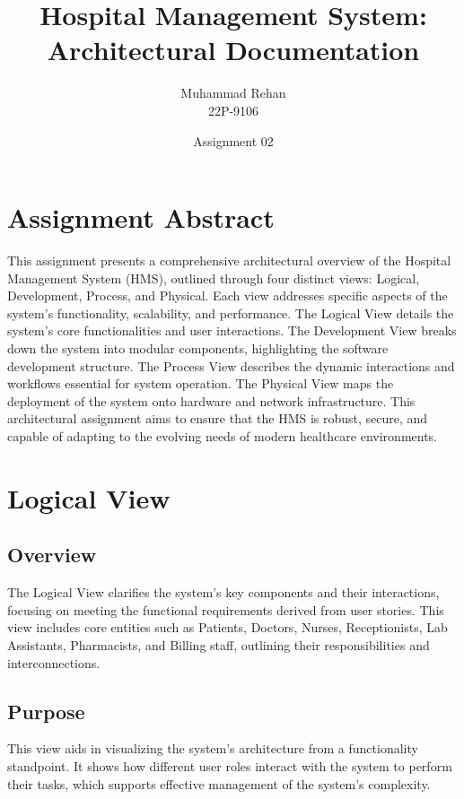 \documentclass[12pt]{article}
\title{Hospital Management System: Architectural Documentation}
\author{Muhammad Rehan \\ 22P-9106}
\date{Assignment 02}
\begin{document}
\maketitle

\section*{Assignment Abstract}
This assignment presents a comprehensive architectural overview of the Hospital Management System (HMS), outlined through four distinct views: Logical, Development, Process, and Physical. Each view addresses specific aspects of the system's functionality, scalability, and performance. The Logical View details the system's core functionalities and user interactions. The Development View breaks down the system into modular components, highlighting the software development structure. The Process View describes the dynamic interactions and workflows essential for system operation. The Physical View maps the deployment of the system onto hardware and network infrastructure. This architectural assignment aims to ensure that the HMS is robust, secure, and capable of adapting to the evolving needs of modern healthcare environments.

\section*{Logical View}
\subsection*{Overview}
The Logical View clarifies the system’s key components and their interactions, focusing on meeting the functional requirements derived from user stories. This view includes core entities such as Patients, Doctors, Nurses, Receptionists, Lab Assistants, Pharmacists, and Billing staff, outlining their responsibilities and interconnections.

\subsection*{Purpose}
This view aids in visualizing the system’s architecture from a functionality standpoint. It shows how different user roles interact with the system to perform their tasks, which supports effective management of the system’s complexity.
\end{document}
